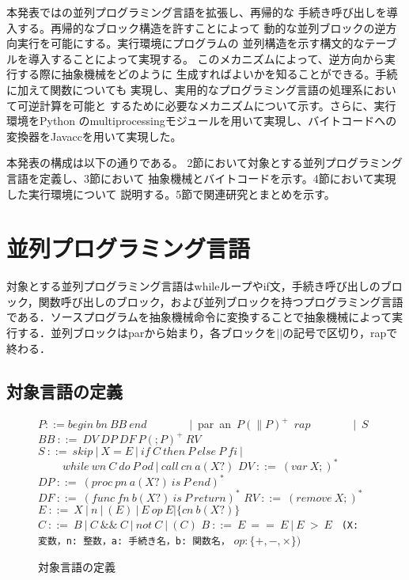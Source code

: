 \documentclass[submit,PRO]{ipsj}
\def\|{\verb|}
\begin{document}
本発表では\cite{RC2020}の並列プログラミング言語を拡張し、再帰的な
手続き呼び出しを導入する。再帰的なブロック構造を許すことによって
動的な並列ブロックの逆方向実行を可能にする。実行環境にプログラムの
並列構造を示す構文的なテーブルを導入することによって実現する。
このメカニズムによって、逆方向から実行する際に抽象機械をどのように
生成すればよいかを知ることができる。手続に加えて関数についても
実現し、実用的なプログラミング言語の処理系において可逆計算を可能と
するために必要なメカニズムについて示す。さらに、実行環境をPython
のmultiprocessingモジュールを用いて実現し、バイトコードへの
変換器をJavaccを用いて実現した。

本発表の構成は以下の通りである。
2節において対象とする並列プログラミング言語を定義し、3節において
抽象機械とバイトコードを示す。4節において実現した実行環境について
説明する。5節で関連研究とまとめを示す。





%3
\section{並列プログラミング言語}

対象とする並列プログラミング言語はwhileループやif文，手続き呼び出しのブロック，関数呼び出しのブロック，および並列ブロックを持つプログラミング言語である．ソースプログラムを抽象機械命令に変換することで抽象機械によって実行する．並列ブロックはparから始まり，各ブロックを$||$の記号で区切り，rapで終わる．

\subsection{対象言語の定義}
\label{sec:3.1}

\begin{figure}[tb]
\vbox{
\hbox{$P ::= begin\ bn\ BB\ end$}
\hbox{\ \ \ \ \ \ \ $|$ par an $P(\parallel P)^+$ $rap$}
\hbox{\ \ \ \ \ \ \ $|$ $S$}
\hbox{$BB\ ::=\ DV\ DP\ DF\ P(;P)^+\ RV$}
\hbox{$S\ ::=\ skip\ |\  X = E\ |\ if\ C\ then\ P\ else\ P\ fi\ |$}
\hbox{$\ \ \ \ \ \ \ \ \ \  while\ wn\ C\ do\ P\ od\ |\ call\ cn\ a(X?)$}
\hbox{$DV\ ::=\ (var\ X;)^*$}
\hbox{$DP\ ::=\ (proc\ pn\ a(X?)\ is\ P\ end)^*$}
\hbox{$DF\ ::=\ (func\ fn\ b(X?)\ is\ P\ return)^*$}
\hbox{$RV\ ::=\ (remove\ X;)^*$}
\hbox{$E\ ::=\ X\ |\ n\ |\ (E)\ |\ E\ op\ E | \{cn\ b(X?)\}$}
\hbox{$C\ ::=\ B\ |\ C\ \&\& \ C\ |\ not\ C\ |\ (C)$}
\hbox{$B\ ::=\ E\ ==\ E\ |\ E\ >\ E$}
\hbox{\\}
\hbox{\| (X: 変数，n: 整数，a: 手続き名，b: 関数名，|}
\hbox{$op: \{+,-,\times \})$}
}
\centerline{}
\caption{対象言語の定義}
\label{fig:def}
\end{figure}
\end{document}
